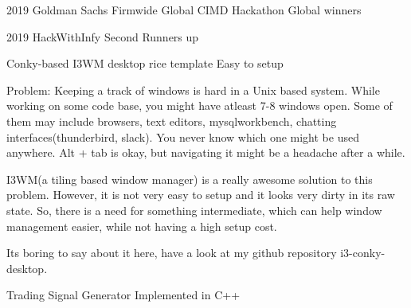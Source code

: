 {2019}
{Goldman Sachs Firmwide Global CIMD Hackathon}
{Global winners}
{\jbegin
\jend}


{2019}
{HackWithInfy}
{Second Runners up}
{\jbegin
\jend}

{}
{Conky-based I3WM desktop rice template}
{Easy to setup}
{\jbegin
    \item{Problem: Keeping a track of windows is hard in a Unix based system. While working on some code base, you might have atleast 7-8 windows open. Some of them may include browsers, text editors, mysqlworkbench, chatting interfaces(thunderbird, slack). You never know which one might be used anywhere. Alt + tab is okay, but navigating it might be a headache after a while.}
    \item {I3WM(a tiling based window manager) is a really awesome solution to this problem. However, it is not very easy to setup and it looks very dirty in its raw state. So, there is a need for something intermediate, which can help window management easier, while not having a high setup cost. }
    \item {Its boring to say about it here, have a look at my github repository i3-conky-desktop.}
\jend}

{}
{Trading Signal Generator}
{Implemented in C++}
{\jbegin
\jend}








